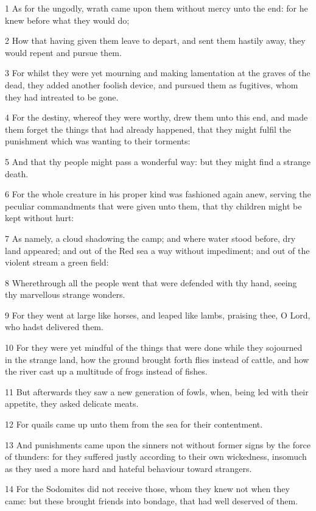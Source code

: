 \par 1 As for the ungodly, wrath came upon them without mercy unto the end: for he knew before what they would do;
\par 2 How that having given them leave to depart, and sent them hastily away, they would repent and pursue them.
\par 3 For whilst they were yet mourning and making lamentation at the graves of the dead, they added another foolish device, and pursued them as fugitives, whom they had intreated to be gone.
\par 4 For the destiny, whereof they were worthy, drew them unto this end, and made them forget the things that had already happened, that they might fulfil the punishment which was wanting to their torments:
\par 5 And that thy people might pass a wonderful way: but they might find a strange death.
\par 6 For the whole creature in his proper kind was fashioned again anew, serving the peculiar commandments that were given unto them, that thy children might be kept without hurt:
\par 7 As namely, a cloud shadowing the camp; and where water stood before, dry land appeared; and out of the Red sea a way without impediment; and out of the violent stream a green field:
\par 8 Wherethrough all the people went that were defended with thy hand, seeing thy marvellous strange wonders.
\par 9 For they went at large like horses, and leaped like lambs, praising thee, O Lord, who hadst delivered them.
\par 10 For they were yet mindful of the things that were done while they sojourned in the strange land, how the ground brought forth flies instead of cattle, and how the river cast up a multitude of frogs instead of fishes.
\par 11 But afterwards they saw a new generation of fowls, when, being led with their appetite, they asked delicate meats.
\par 12 For quails came up unto them from the sea for their contentment.
\par 13 And punishments came upon the sinners not without former signs by the force of thunders: for they suffered justly according to their own wickedness, insomuch as they used a more hard and hateful behaviour toward strangers.
\par 14 For the Sodomites did not receive those, whom they knew not when they came: but these brought friends into bondage, that had well deserved of them.
